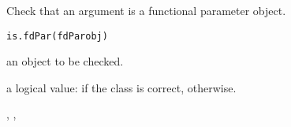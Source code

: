 \begin{Description}\relax
Check that an argument is a functional parameter object.
\end{Description}
\begin{Usage}
\begin{verbatim}
is.fdPar(fdParobj)
\end{verbatim}
\end{Usage}
\begin{Arguments}
\begin{ldescription}
\item[\code{fdParobj}] an object to be checked.

\end{ldescription}
\end{Arguments}
\begin{Value}
a logical value:
 if the class is correct,  otherwise.
\end{Value}
\begin{SeeAlso}\relax
{}, 
, 
\end{SeeAlso}

